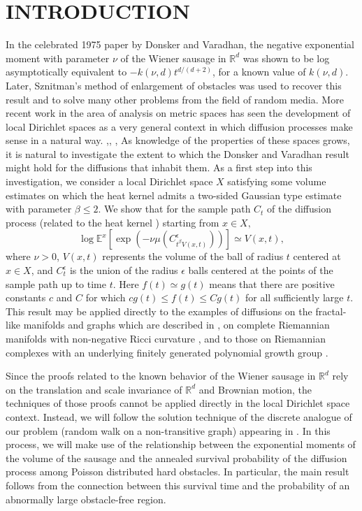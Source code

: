 \documentclass[letterpaper,oneside,english]{amsart}
\begin{document}
\section{INTRODUCTION} 
\label{intro}
In the celebrated 1975 paper by Donsker and Varadhan, the negative exponential moment with parameter $\nu$ of the Wiener sausage in $\mathbb{R}^d$ was shown to be log asymptotically equivalent to $ -k(\nu,d)t^{d/(d+2)}$, for a known value of $k(\nu,d)$. \cite{DV}  Later, Sznitman's method of enlargement of obstacles was used to recover this result and to solve many other problems from the field of random media. \cite{SznBook} More recent work in the area of analysis on metric spaces has seen the development of local Dirichlet spaces as a very general context in which diffusion processes make sense in a natural way. \cite{LSCBendikov},\cite{LSCHebisch}, \cite{Sturm}, As knowledge of the properties of these spaces grows, it is natural to investigate the extent to which the Donsker and Varadhan result might hold for the diffusions that inhabit them.  As a first step into this investigation, we consider a local Dirichlet space $X$ satisfying some volume estimates on which the heat kernel admits a two-sided Gaussian type estimate with parameter $\beta \le 2$.  We show that for the sample path $C_t$ of the diffusion process (related to the heat kernel \cite{SturmDiffHK}) starting from $x \in X,$  
$$  \log \mathbb{E}^x\left[\exp\left(-\nu \mu\left(C_{t^{\beta}V(x,t)}^\epsilon\right)\right) \right] \simeq V(x,t),
$$
where $\nu>0$, $V(x,t)$  represents the volume of the ball of radius $t$ centered at $x\in X$, and $C_t^{\epsilon}$ is the union of the radius $\epsilon$ balls centered at the points of the sample path up to time $t$.  Here $f(t)\simeq g(t)$ means that there are positive constants $c$ and $C$ for which $cg(t)\le f(t) \le Cg(t)$ for all sufficiently large $t$.
This result may be applied directly to the examples of diffusions on the fractal-like manifolds and graphs which are described in \cite{BBK}, on complete Riemannian manifolds with non-negative Ricci curvature \cite{LiYau}, and to those on Riemannian complexes with an underlying finitely generated polynomial growth group \cite{PivarskiLSC}.

Since the proofs related to the known behavior of the Wiener sausage in $\mathbb{R}^d$ rely on the translation and scale invariance of $\mathbb{R}^d$ and Brownian motion, the techniques of those proofs cannot be applied directly in the local Dirichlet space context.  Instead, we will follow the solution technique of the discrete analogue of our problem (random walk on a non-transitive graph) appearing in \cite{Gibson}.  In this process, we will make use of the relationship between the exponential moments of the volume of the sausage and the annealed survival probability of the diffusion process among Poisson distributed hard obstacles.   In particular, the main result follows from the connection between this survival time and the probability of an abnormally large obstacle-free region.  
\end{document}
